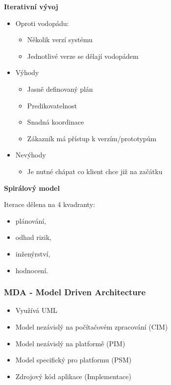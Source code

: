     \textbf{Iterativní vývoj}

      \begin{itemize}
        \item Oproti vodopádu:
          \begin{itemize}
            \item Několik verzí systému
            \item Jednotlivé verze se dělají vodopádem
          \end{itemize}
        \item Výhody
          \begin{itemize}
            \item Jasně definovaný plán
            \item Predikovatelnost
            \item Snadná koordinace
            \item Zákazník má přístup k verzím/prototypům
          \end{itemize}
        \item Nevýhody
          \begin{itemize}
            \item Je nutné chápat co klient chce již na začátku
          \end{itemize}
      \end{itemize}

      \textbf{Spirálový model}

        Iterace dělena na 4 kvadranty:
          \begin{itemize}
            \item plánování,
            \item odhad rizik,
            \item inženýrství,
            \item hodnocení.
          \end{itemize}

      \subsubsection{MDA - Model Driven Architecture}
        \begin{itemize}
          \item Využívá UML
          \item Model nezávislý na počítačovém zpracování (CIM)
          \item Model nezávislý na platformě (PIM)
          \item Model specifický pro platformu (PSM)
          \item Zdrojový kód aplikace (Implementace)
        \end{itemize}

